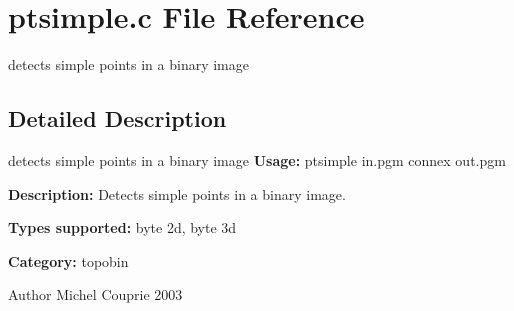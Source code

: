 \section{ptsimple.c File Reference}
\label{ptsimple_8c}


detects simple points in a binary image  




\subsection{Detailed Description}
detects simple points in a binary image {\bfseries Usage:} ptsimple in.pgm connex out.pgm

{\bfseries Description:} Detects simple points in a binary image.

{\bfseries Types supported:} byte 2d, byte 3d

{\bfseries Category:} topobin

\begin{DoxyAuthor}{Author}
Michel Couprie 2003 
\end{DoxyAuthor}
